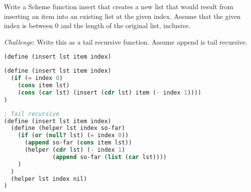 \begin{blocksection}
\question Write a Scheme function insert that creates a new list that would result from inserting an item into an existing list at the given index.
Assume that the given index is between 0 and the length of the original list, inclusive.

\emph{Challenge}: Write this as a tail recursive function. Assume append is tail recursive.

\begin{lstlisting}[language=Scheme]
(define (insert lst item index)
\end{lstlisting}

\begin{solution}[0.5in]
\begin{lstlisting}[language=Scheme]
(define (insert lst item index)
  (if (= index 0)
    (cons item lst)
    (cons (car lst) (insert (cdr lst) item (- index 1))))
)
\end{lstlisting}
\end{solution}

\begin{solution}
\begin{lstlisting}[language=Scheme]
; Tail recursive
(define (insert lst item index)
  (define (helper lst index so-far)
    (if (or (null? lst) (= index 0))
      (append so-far (cons item lst))
      (helper (cdr lst) (- index 1)
              (append so-far (list (car lst))))
    )
  )
  (helper lst index nil)
)
\end{lstlisting}
\end{solution}
\end{blocksection}
